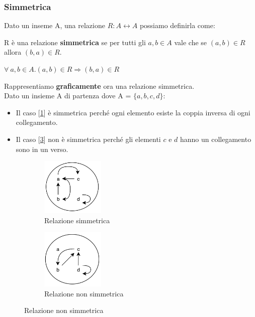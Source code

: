 \subsubsection{Simmetrica}
Dato un inseme A, una relazione $R: A \leftrightarrow A$ possiamo definirla come:
\begin{definition}[Simmetrica]
    R è una relazione \textbf{simmetrica} se per tutti gli $a,b \in A$ vale che se $(a, b) \in R$ allora $(b,a) \in R$.
    \begin{center}
        $\forall \: a,b \in A . (a, b) \in R \Rightarrow (b,a) \in R$
    \end{center}
\end{definition}
Rappresentiamo \textbf{graficamente} ora una relazione simmetrica. \\Dato un insieme A di partenza dove A = $\{a, b, c, d\}$:
\begin{itemize}
    \item Il caso [\ref{fig:relazione-simmetrica}] è simmetrica perché ogni elemento esiste la coppia inversa di ogni collegamento.
    \item Il caso [\ref{fig:relazione-non-simmetrica}] non è simmetrica perché gli elementi $c$ e $d$ hanno un collegamento sono in un verso.
\end{itemize}
\begin{figure}[h!]
    \vspace{-10pt}
    \centering
    \begin{subfigure}{.3\textwidth}
        \centering
        \includegraphics[width=3cm]{images/relazione-simmetrica.png}
        \caption{Relazione simmetrica}
        \label{fig:relazione-simmetrica}
    \end{subfigure}
    \hspace{1.5cm}
    \begin{subfigure}{.3\textwidth}
        \centering
        \includegraphics[width=3cm]{images/relazione-non-simmetrica.png}
        \caption{Relazione non simmetrica}
        \label{fig:relazione-non-simmetrica}
    \end{subfigure}
\end{figure}
